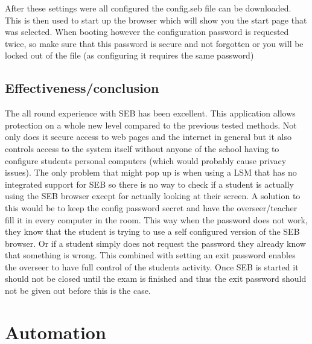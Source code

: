 After these settings were all configured the config.seb file can be downloaded. This is then used to start up the browser which will show you the start page that was selected. When booting however the configuration password is requested twice, so make sure that this password is secure and not forgotten or you will be locked out of the file (as configuring it requires the same password)
\subsection{Effectiveness/conclusion}
The all round experience with SEB has been excellent. This application allows protection on a whole new level compared to the previous tested methods. Not only does it secure access to web pages and the internet in general but it also controls access to the system itself without anyone of the school having to configure students personal computers (which would probably cause  privacy issues). The only problem that might pop up is when using a LSM that has no integrated support for SEB so there is no way to check if a student is actually using the SEB browser except for actually looking at their screen. A solution to this would be to keep the config password secret and have the overseer/teacher fill it in every computer in the room. This way when the password does not work, they know that the student is trying to use a self configured version of the SEB browser. Or if a student simply does not request the password they already know that something is wrong. This combined with setting an exit password enables the overseer to have full control of the students activity. Once SEB is started it should not be closed until the exam is finished and thus the exit password should not be given out before this is the case.






\section{Automation}
